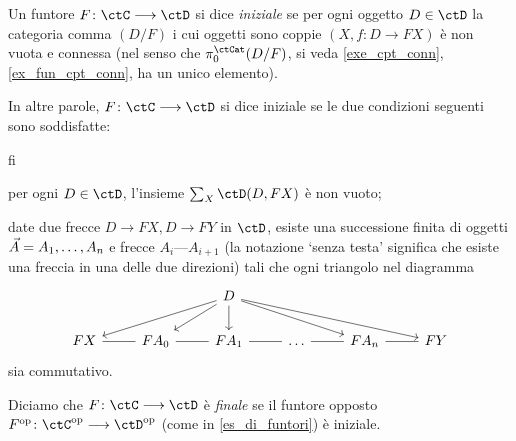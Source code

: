\begin{definition}\label{def_fun_initfin}
 Un funtore \(F \colon \ctC\fun\ctD\) si dice \emph{iniziale} se per ogni oggetto \(D\in\ctD\) la categoria comma \((D/F)\) i cui oggetti sono coppie \((X,f \colon D\to FX)\) è non vuota e connessa (nel senso che \(\pi_0^\ctCat(D/F)\), si veda \ref{exe_cpt_conn}, \ref{ex_fun_cpt_conn}, ha un unico elemento).

 In altre parole, \(F \colon \ctC\fun\ctD\) si dice iniziale se le due condizioni seguenti sono soddisfatte:
 \begin{enumtag}{fi}
  \item \label{fi_1} per ogni \(D\in\ctD\), l'insieme \(\sum_X\Hom{\ctD}(D,FX)\) è non vuoto;
  \item \label{fi_2} date due frecce \(D\to FX, D\to FY\) in \(\ctD\), esiste una successione finita di oggetti \(\vec A = {\tup An,}\) e frecce \(A_i \text{---} A_{i+1}\) (la notazione `senza testa' significa che esiste una freccia in una delle due direzioni) tali che ogni triangolo nel diagramma
  \[\begin{tikzcd}
    && D \\
    FX & {FA_0} & {FA_1} & \dots & {FA_n} & FY
    \arrow[from=1-3, to=2-1]
    \arrow[from=1-3, to=2-2]
    \arrow[from=1-3, to=2-3]
    \arrow[from=1-3, to=2-5]
    \arrow[from=1-3, to=2-6]
    \arrow[no head, from=2-1, to=2-2]
    \arrow[no head, from=2-2, to=2-3]
    \arrow[no head, from=2-3, to=2-4]
    \arrow[no head, from=2-4, to=2-5]
    \arrow[no head, from=2-5, to=2-6]
   \end{tikzcd}\]
  sia commutativo.
 \end{enumtag}
 Diciamo che \(F \colon \ctC\fun\ctD\) è \emph{finale} se il funtore opposto \(F^\op \colon \ctC^\op\fun\ctD^\op\) (come in \ref{es_di_funtori}) è iniziale.
\end{definition}
